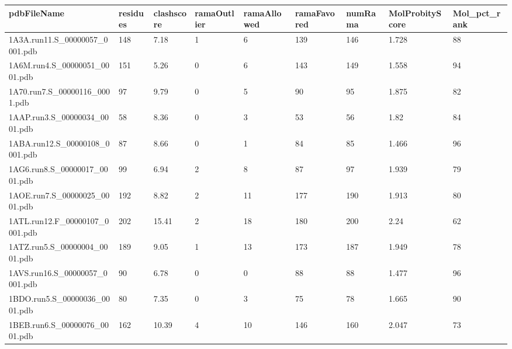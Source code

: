 \documentclass{bioinfo}
\begin{document}
\begin{table}[!t]
{\begin{tabular}{lllllllll}\toprule
    pdbFileName             & residues & clashscore & ramaOutlier & ramaAllowed & ramaFavored & numRama & MolProbityScore & Mol\_pct\_rank \\ \midrule
    1A3A.run11.S\_00000057\_0001.pdb & 148      & 7.18       & 1           & 6           & 139         & 146     & 1.728           & 88           \\
    1A6M.run4.S\_00000051\_0001.pdb & 151      & 5.26       & 0           & 6           & 143         & 149     & 1.558           & 94           \\
    1A70.run7.S\_00000116\_0001.pdb & 97       & 9.79       & 0           & 5           & 90          & 95      & 1.875           & 82           \\
    1AAP.run3.S\_00000034\_0001.pdb & 58       & 8.36       & 0           & 3           & 53          & 56      & 1.82            & 84           \\
    1ABA.run12.S\_00000108\_0001.pdb & 87       & 8.66       & 0           & 1           & 84          & 85      & 1.466           & 96           \\
    1AG6.run8.S\_00000017\_0001.pdb & 99       & 6.94       & 2           & 8           & 87          & 97      & 1.939           & 79           \\
    1AOE.run7.S\_00000025\_0001.pdb & 192      & 8.82       & 2           & 11          & 177         & 190     & 1.913           & 80           \\
    1ATL.run12.F\_00000107\_0001.pdb & 202      & 15.41      & 2           & 18          & 180         & 200     & 2.24            & 62           \\
    1ATZ.run5.S\_00000004\_0001.pdb & 189      & 9.05       & 1           & 13          & 173         & 187     & 1.949           & 78           \\
    1AVS.run16.S\_00000057\_0001.pdb & 90       & 6.78       & 0           & 0           & 88          & 88      & 1.477           & 96           \\
    1BDO.run5.S\_00000036\_0001.pdb & 80       & 7.35       & 0           & 3           & 75          & 78      & 1.665           & 90           \\
    1BEB.run6.S\_00000076\_0001.pdb & 162      & 10.39      & 4           & 10          & 146         & 160     & 2.047           & 73           \\

\end{tabular}}
\end{table}
\end{document}
